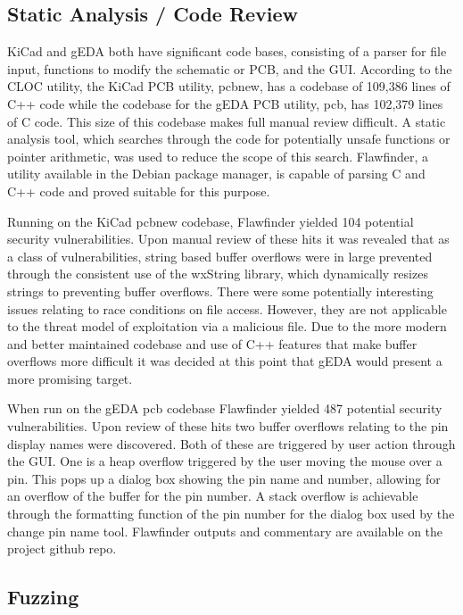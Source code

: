 \documentclass[12pt]{article}
\begin{document}
\subsection{Static Analysis / Code Review}
KiCad and gEDA both have significant code bases, consisting of a parser for file input, functions to modify the schematic or PCB, and the GUI. According to the CLOC utility, the KiCad PCB utility, pcbnew, has a codebase of 109,386 lines of C++ code while the codebase for the gEDA PCB utility, pcb, has 102,379 lines of C code. This size of this codebase makes full manual review difficult. A static analysis tool, which searches through the code for potentially unsafe functions or pointer arithmetic, was used to reduce the scope of this search. Flawfinder, a utility available in the Debian package manager, is capable of parsing C and C++ code and proved suitable for this purpose. 

Running on the KiCad pcbnew codebase, Flawfinder yielded 104 potential security vulnerabilities. Upon manual review of these hits it was revealed that as a class of vulnerabilities, string based buffer overflows were in large prevented through the consistent use of the wxString library, which dynamically resizes strings to preventing buffer overflows. There were some potentially interesting issues relating to race conditions on file access. However, they are not applicable to the threat model of exploitation via a malicious file. Due to the more modern and better maintained codebase and use of C++ features that make buffer overflows more difficult it was decided at this point that gEDA would present a more promising target. 

When run on the gEDA pcb codebase Flawfinder yielded 487 potential security vulnerabilities. Upon review of these hits two buffer overflows relating to the pin display names were discovered. Both of these are triggered by user action through the GUI. One is a heap overflow triggered by the user moving the mouse over a pin. This pops up a dialog box showing the pin name and number, allowing for an overflow of the buffer for the pin number. A stack overflow is achievable through the formatting function of the pin number for the dialog box used by the change pin name tool. Flawfinder outputs and commentary are available on the project github repo. 

\subsection{Fuzzing}
\end{document}
